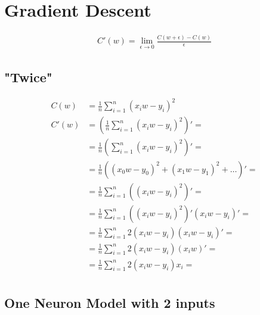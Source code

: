 \documentclass{article}
\begin{document}
    \section{Gradient Descent}
    \begin{align}
        C'(w) = \lim_{\epsilon \to 0}\frac{C(w + \epsilon) - C(w)}{\epsilon}
    \end{align}

    \subsection{"Twice"}
    \begin{align}
        C(w) &= \frac{1}{n}\sum_{i=1}^{n}(x_iw - y_i)^2  \\
        C'(w)
           &= \left(\frac{1}{n}\sum_{i=1}^{n}(x_iw - y_i)^2\right)' =\\
           &= \frac{1}{n}\left(\sum_{i=1}^{n}(x_iw - y_i)^2\right)' =\\
           &= \frac{1}{n}\left((x_0w - y_0)^2 + (x_1w - y_1)^2 + \hdots\right)' =\\
           &= \frac{1}{n}\sum_{i=1}^{n}\left((x_iw - y_i)^2\right)' =\\ %
           &= \frac{1}{n}\sum_{i=1}^{n}((x_iw - y_i)^2)'(x_iw - y_i)' =\\ %
           &= \frac{1}{n}\sum_{i=1}^{n}2(x_iw - y_i)(x_iw - y_i)' =\\
           &= \frac{1}{n}\sum_{i=1}^{n}2(x_iw - y_i)(x_iw)' =\\
           &= \frac{1}{n}\sum_{i=1}^{n}2(x_iw - y_i)x_i =\\
    \end{align}

    \newpage

    \subsection{One Neuron Model with 2 inputs}
    \def\d{2}
    \begin{center}
    \end{center}
\end{document}
